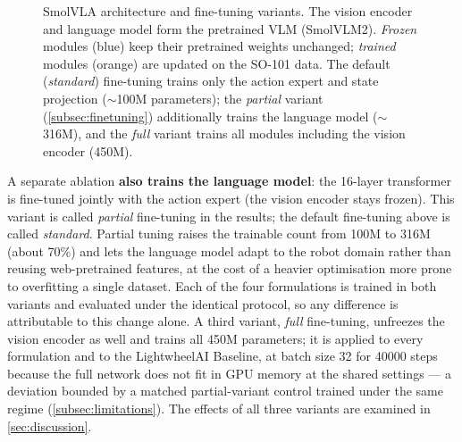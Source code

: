 \begin{figure}[H]
    \caption{SmolVLA architecture and fine-tuning variants. The vision encoder and language model form the pretrained VLM (SmolVLM2). \emph{Frozen} modules (blue) keep their pretrained weights unchanged; \emph{trained} modules (orange) are updated on the SO-101 data. The default (\emph{standard}) fine-tuning trains only the action expert and state projection ($\sim$\num{100}M parameters); the \emph{partial} variant (\cref{subsec:finetuning}) additionally trains the language model ($\sim$\num{316}M), and the \emph{full} variant trains all modules including the vision encoder (\num{450}M).}
    \label{fig:smolvla_finetune}
\end{figure}

A separate ablation \textbf{also trains the language model}: the 16-layer transformer is fine-tuned jointly with the action expert (the vision encoder stays frozen). This variant is called \emph{partial} fine-tuning in the results; the default fine-tuning above is called \emph{standard}. Partial tuning raises the trainable count from \num{100}M to \num{316}M (about 70\%) and lets the language model adapt to the robot domain rather than reusing web-pretrained features, at the cost of a heavier optimisation more prone to overfitting a single dataset. Each of the four formulations is trained in both variants and evaluated under the identical protocol, so any difference is attributable to this change alone. A third variant, \emph{full} fine-tuning, unfreezes the vision encoder as well and trains all \num{450}M parameters; it is applied to every formulation and to the LightwheelAI Baseline, at batch size 32 for \num{40000} steps because the full network does not fit in GPU memory at the shared settings --- a deviation bounded by a matched partial-variant control trained under the same regime (\cref{subsec:limitations}). The effects of all three variants are examined in \cref{sec:discussion}.

